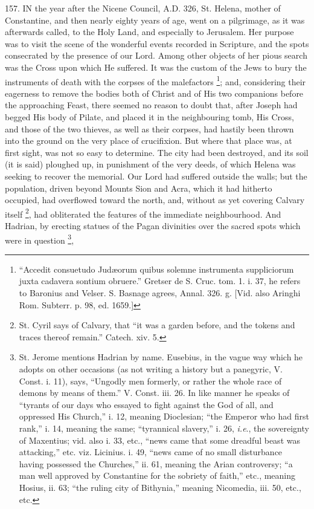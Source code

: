 157.
IN the year after the Nicene
Council, A.D. 326, St. Helena,
mother of Constantine, and then nearly eighty years of age, went on a
pilgrimage, as it was afterwards called, to the Holy Land, and
especially to Jerusalem. Her purpose was to visit the scene of the
wonderful events recorded in Scripture, and the spots consecrated by
the presence of our Lord. Among other objects of her pious search was
the Cross upon which He suffered. It was the custom of the Jews to
bury the instruments of death with the corpses of the malefactors \footnote{``Accedit consuetudo Judæorum quibus solemne
instrumenta suppliciorum juxta cadavera sontium obruere.'' Gretser de
S. Cruc. tom. 1. i. 37, he refers to Baronius and Velser. S. Basnage
agrees, Annal. 326. g. [Vid. also Aringhi Rom. Subterr. p. 98, ed.
1659.]}; and, considering their eagerness to remove the bodies both of
Christ and of His two companions before the approaching Feast, there
seemed no reason to doubt that, after Joseph had begged His body of
Pilate, and placed it in the neighbouring tomb, His Cross, and those of the two thieves, as well as their corpses, had hastily been
thrown into the ground on the very place of crucifixion. But where
that place was, at first sight, was not so easy to determine. The city
had been destroyed, and its soil (it is said) ploughed up, in
punishment of the very deeds, of which Helena was seeking to recover
the memorial. Our Lord had suffered outside the walls; but the
population, driven beyond Mounts Sion and Acra, which it had hitherto
occupied, had overflowed toward the north, and, without as yet
covering Calvary itself \footnote{St. Cyril says of Calvary, that ``it was a garden before, and the
tokens and traces thereof remain.'' Catech. xiv. 5.},
had obliterated the features of the immediate neighbourhood. And
Hadrian, by erecting statues of the Pagan divinities over the sacred
spots which were in question \footnote{St. Jerome mentions Hadrian by name. Eusebius, in the vague way which
he adopts on other occasions (as not writing a history but a
panegyric, V. Const. i. 11), says, ``Ungodly men formerly, or rather
the whole race of demons by means of them.'' V. Const. iii. 26. In like
manner he speaks of ``tyrants of our days who essayed to fight against
the God of all, and oppressed His Church,'' i. 12, meaning Dioclesian;
``the Emperor who had first rank,'' i. 14, meaning the same;
``tyrannical slavery,'' i. 26, \emph{i.e}., the sovereignty of
Maxentius; vid. also i. 33, etc., ``news came that some dreadful beast
was attacking,'' etc. viz. Licinius. i. 49, ``news came of no small
disturbance having possessed the Churches,'' ii. 61, meaning the Arian
controversy; ``a man well approved by Constantine for the sobriety of
faith,'' etc., meaning Hosius, ii. 63; ``the ruling city of Bithynia,''
meaning Nicomedia, iii. 50, etc., etc.},
